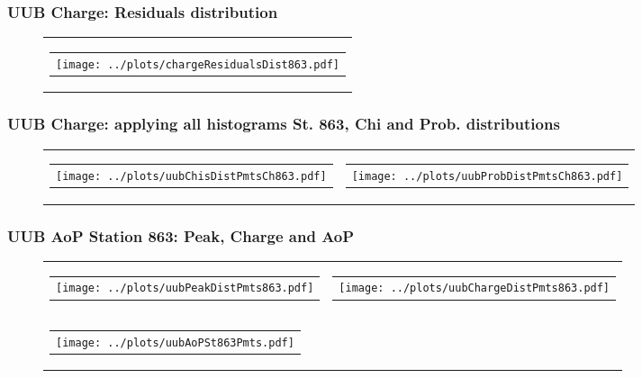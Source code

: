 \documentclass[aspectratio=169]{beamer}
\begin{document}
\begin{frame}
  \frametitle{UUB Charge: Residuals distribution}
  \begin{figure}
    \centering
    \begin{tabularx}{\textwidth}{C}
      \begin{tabular}{l}
        \texttt{[image: ../plots/chargeResidualsDist863.pdf]}
      \end{tabular}
    \end{tabularx}
  \end{figure}
\end{frame}


\begin{frame}
  \frametitle{UUB Charge: applying all histograms St. 863, Chi and Prob. distributions}
  \begin{figure}
    \centering
    \begin{tabularx}{\textwidth}{CC}
      \begin{tabular}{l}
        \texttt{[image: ../plots/uubChisDistPmtsCh863.pdf]}
      \end{tabular}
      &
      \begin{tabular}{l}
        \texttt{[image: ../plots/uubProbDistPmtsCh863.pdf]}
      \end{tabular}
    \end{tabularx}
  \end{figure}
\end{frame}



\begin{frame}
  \frametitle{UUB AoP Station 863: Peak, Charge and AoP}
  \begin{figure}
    \centering
    \begin{tabularx}{\textwidth}{CC}
      \begin{tabular}{l}
        \texttt{[image: ../plots/uubPeakDistPmts863.pdf]}
      \end{tabular}
      &
      \begin{tabular}{l}
        \texttt{[image: ../plots/uubChargeDistPmts863.pdf]}
      \end{tabular}
      \\
      \begin{tabular}{l}
        \texttt{[image: ../plots/uubAoPSt863Pmts.pdf]}
      \end{tabular}
    \end{tabularx}
  \end{figure}
\end{frame}
\end{document}
